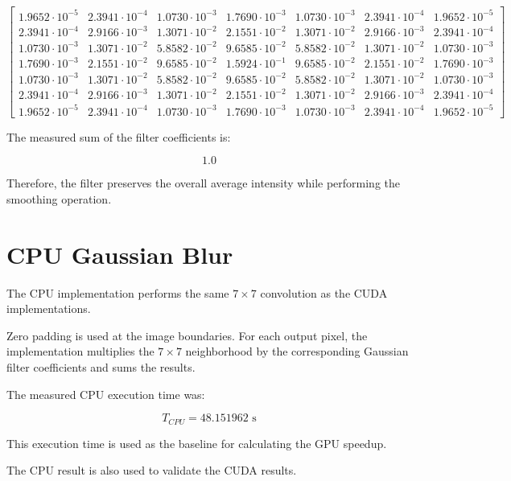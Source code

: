\documentclass[11pt]{article}
\begin{document}
\[
\begin{bmatrix}
1.9652\cdot10^{-5} & 2.3941\cdot10^{-4} & 1.0730\cdot10^{-3} &
1.7690\cdot10^{-3} & 1.0730\cdot10^{-3} & 2.3941\cdot10^{-4} &
1.9652\cdot10^{-5}\\
2.3941\cdot10^{-4} & 2.9166\cdot10^{-3} & 1.3071\cdot10^{-2} &
2.1551\cdot10^{-2} & 1.3071\cdot10^{-2} & 2.9166\cdot10^{-3} &
2.3941\cdot10^{-4}\\
1.0730\cdot10^{-3} & 1.3071\cdot10^{-2} & 5.8582\cdot10^{-2} &
9.6585\cdot10^{-2} & 5.8582\cdot10^{-2} & 1.3071\cdot10^{-2} &
1.0730\cdot10^{-3}\\
1.7690\cdot10^{-3} & 2.1551\cdot10^{-2} & 9.6585\cdot10^{-2} &
1.5924\cdot10^{-1} & 9.6585\cdot10^{-2} & 2.1551\cdot10^{-2} &
1.7690\cdot10^{-3}\\
1.0730\cdot10^{-3} & 1.3071\cdot10^{-2} & 5.8582\cdot10^{-2} &
9.6585\cdot10^{-2} & 5.8582\cdot10^{-2} & 1.3071\cdot10^{-2} &
1.0730\cdot10^{-3}\\
2.3941\cdot10^{-4} & 2.9166\cdot10^{-3} & 1.3071\cdot10^{-2} &
2.1551\cdot10^{-2} & 1.3071\cdot10^{-2} & 2.9166\cdot10^{-3} &
2.3941\cdot10^{-4}\\
1.9652\cdot10^{-5} & 2.3941\cdot10^{-4} & 1.0730\cdot10^{-3} &
1.7690\cdot10^{-3} & 1.0730\cdot10^{-3} & 2.3941\cdot10^{-4} &
1.9652\cdot10^{-5}
\end{bmatrix}
\]

The measured sum of the filter coefficients is:

\[
\boxed{1.0}
\]

Therefore, the filter preserves the overall average intensity while
performing the smoothing operation.

\section{CPU Gaussian Blur}

The CPU implementation performs the same $7\times7$ convolution as the
CUDA implementations.

Zero padding is used at the image boundaries. For each output pixel,
the implementation multiplies the $7\times7$ neighborhood by the
corresponding Gaussian filter coefficients and sums the results.

The measured CPU execution time was:

\[
\boxed{T_{CPU}=48.151962\text{ s}}
\]

This execution time is used as the baseline for calculating the GPU
speedup.

The CPU result is also used to validate the CUDA results.
\end{document}
